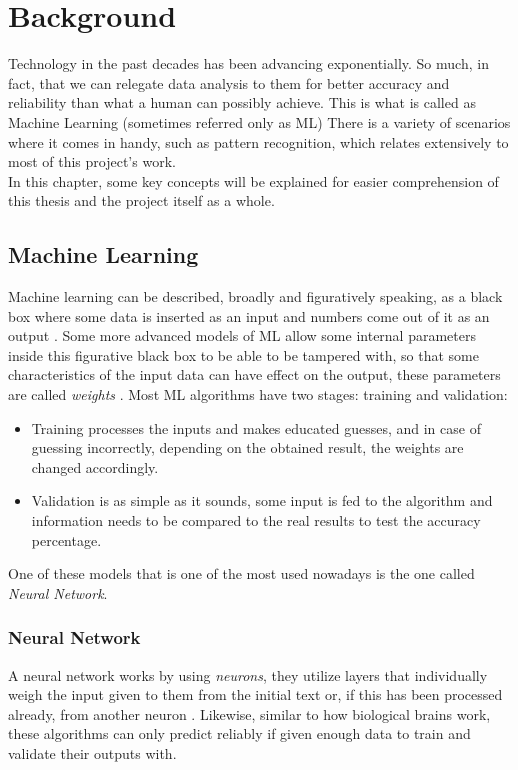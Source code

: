 \chapter{Background}
Technology in the past decades has been advancing exponentially. So much, in fact, that we can relegate data analysis to them for better accuracy and reliability than what a human can possibly achieve. This is what is called as Machine Learning (sometimes referred only as ML)
There is a variety of scenarios where it comes in handy, such as pattern recognition, which relates extensively to most of this project's work.\\
In this chapter, some key concepts will be explained for easier comprehension of this thesis and the project itself as a whole.

\section{Machine Learning}
Machine learning can be described, broadly and figuratively speaking, as a black box where some data is inserted as an input and numbers come out of it as an output \citep{rf8}.
Some more advanced models of ML allow some internal parameters inside this figurative black box to be able to be tampered with, so that some characteristics of the input data can have effect on the output, these parameters are called \textit{weights} \citep{rf9}.
Most ML algorithms have two stages: training and validation:
\begin{itemize}
\item Training processes the inputs and makes educated guesses, and in case of guessing incorrectly, depending on the obtained result, the weights are changed accordingly.
\item Validation is as simple as it sounds, some input is fed to the algorithm and information needs to be compared to the real results to test the accuracy percentage.
\end{itemize}
One of these models that is one of the most used nowadays is the one called \textit{Neural Network}.

\subsection{Neural Network}
A neural network works by using \textit{neurons}, they utilize layers that individually weigh the input given to them from the initial text or, if this has been processed already, from another neuron \citep{rf9}.
Likewise, similar to how biological brains work, these algorithms can only predict reliably if given enough data to train and validate their outputs with.

